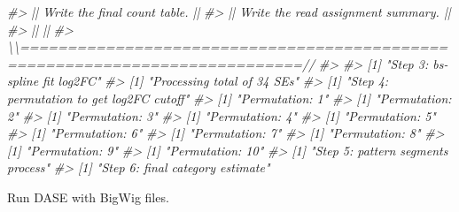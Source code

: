 \documentclass[
]{article}
\newenvironment{Shaded}{\begin{snugshade}}{\end{snugshade}}
\newcommand{\CommentTok}[1]{\textcolor[rgb]{0.56,0.35,0.01}{\textit{#1}}}
\begin{document}
\begin{Shaded}
\begin{Highlighting}[]
\CommentTok{\#\textgreater{} || Write the final count table.                                               ||}
\CommentTok{\#\textgreater{} || Write the read assignment summary.                                         ||}
\CommentTok{\#\textgreater{} ||                                                                            ||}
\CommentTok{\#\textgreater{} \textbackslash{}\textbackslash{}============================================================================//}
\CommentTok{\#\textgreater{} }
\CommentTok{\#\textgreater{} [1] "Step 3: bs{-}spline fit log2FC"}
\CommentTok{\#\textgreater{} [1] "Processing total of 34 SEs"}
\CommentTok{\#\textgreater{} [1] "Step 4: permutation to get log2FC cutoff"}
\CommentTok{\#\textgreater{} [1] "Permutation: 1"}
\CommentTok{\#\textgreater{} [1] "Permutation: 2"}
\CommentTok{\#\textgreater{} [1] "Permutation: 3"}
\CommentTok{\#\textgreater{} [1] "Permutation: 4"}
\CommentTok{\#\textgreater{} [1] "Permutation: 5"}
\CommentTok{\#\textgreater{} [1] "Permutation: 6"}
\CommentTok{\#\textgreater{} [1] "Permutation: 7"}
\CommentTok{\#\textgreater{} [1] "Permutation: 8"}
\CommentTok{\#\textgreater{} [1] "Permutation: 9"}
\CommentTok{\#\textgreater{} [1] "Permutation: 10"}
\CommentTok{\#\textgreater{} [1] "Step 5: pattern segments process"}
\CommentTok{\#\textgreater{} [1] "Step 6: final category estimate"}
\end{Highlighting}
\end{Shaded}

Run DASE with BigWig files.
\end{document}

